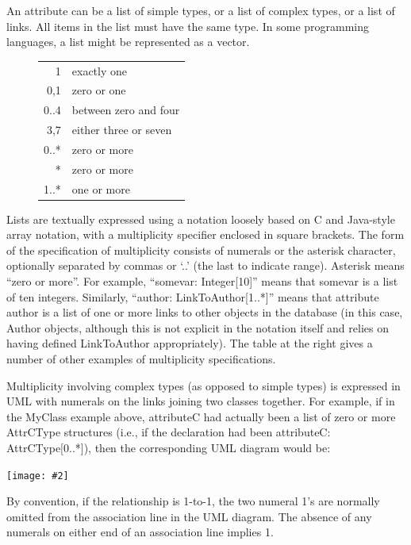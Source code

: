\documentclass[10pt]{article}
\newcommand{\figNB}[2][]{\texttt{[image: \#2]}}
\newcommand{\class}[1]{\textsf{#1}}
\newcommand{\attrib}[1]{\textsf{#1}}
\begin{document}
An attribute can be a list of simple types, or a list of complex types,
or a list of links.  All items in the list must have the same type.  In
some programming languages, a list might be represented as a vector.
\begin{figure}
  \begin{center}
    \begin{tabular}{rl}
      1 & exactly one\\
      0,1 & zero or one\\
      0..4 & between zero and four\\
      3,7 & either three or seven\\
      0..* & zero or more\\
      \textrm{*} & zero or more\\
      1..* & one or more
    \end{tabular}
  \end{center}
\end{figure}
Lists are textually expressed using a notation loosely based on C and
Java-style array notation, with a multiplicity specifier enclosed in square
brackets.  The form of the specification of multiplicity consists of
numerals or the asterisk character, optionally separated by commas or `..'
(the last to indicate range).  Asterisk means ``zero or more''.  For
example, ``\attrib{somevar: Integer[10]}'' means that \attrib{somevar} is a
list of ten integers.  Similarly, ``\attrib{author: LinkToAuthor[1..*]}''
means that attribute \attrib{author} is a list of one or more links to
other \mbox{objects} in the database (in this case, \class{Author} objects,
although this is not explicit in the notation itself and relies on having
defined \class{LinkToAuthor} appropriately).  The table at the right gives
a number of other examples of multiplicity specifications.

Multiplicity involving complex types (as opposed to simple types) is
expressed in UML with numerals on the links joining two classes together.
For example, if in the \class{MyClass} example above, \attrib{attributeC}
had actually been a list of zero or more \class{AttrCType} structures
(i.e., if the declaration had been \attrib{attributeC: AttrCType[0..*]}),
then the corresponding UML diagram would be:

\begin{center}
  \figNB[scale = 0.7]{someschema-uml-multiple.eps}
\end{center}

By convention, if the relationship is 1-to-1, the two numeral 1's are
normally omitted from the association line in the UML diagram.  The absence
of any numerals on either end of an association line implies 1.
\end{document}
